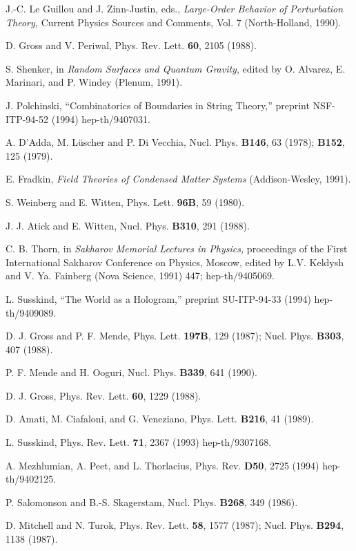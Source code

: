 \begin{thebibliography}{99}
 J.-C. Le Guillou and J. Zinn-Justin, eds., {\it
Large-Order Behavior of Perturbation Theory,} Current Physics
Sources and Comments, Vol. 7 (North-Holland, 1990).

 D. Gross and V. Periwal, Phys. Rev. Lett. {\bf 60},
2105 (1988).

 S. Shenker, in {\it Random Surfaces and Quantum
Gravity}, edited by O. Alvarez, E. Marinari, and P. Windey
(Plenum, 1991).

 J. Polchinski, ``Combinatorics of Boundaries in
String Theory,'' preprint NSF-ITP-94-52 (1994) hep-th/9407031.

 A. D'Adda, M. L\"uscher and P. Di Vecchia,
Nucl. Phys. {\bf B146}, 63 (1978); {\bf B152}, 125 (1979).

 E. Fradkin, {\it Field Theories of Condensed
Matter Systems} (Addison-Wesley, 1991).

 S. Weinberg and E. Witten, Phys. Lett. {\bf 96B}, 59 (1980).

 J. J. Atick and E. Witten, Nucl. Phys. {\bf B310},
291 (1988).

 C. B. Thorn, in {\it Sakharov Memorial Lectures in
Physics,} proceedings of the First
International Sakharov Conference on Physics, Moscow,
edited by L.V. Keldysh and V. Ya. Fainberg (Nova Science, 1991)
447; hep-th/9405069.

 L. Susskind, ``The World as a Hologram,''
preprint SU-ITP-94-33 (1994) hep-th/9409089.

 D. J. Gross and P. F. Mende,
Phys. Lett. {\bf 197B}, 129 (1987); Nucl. Phys.
{\bf B303}, 407 (1988).

 P. F. Mende and H. Ooguri,
Nucl. Phys. {\bf B339}, 641 (1990).

 D. J. Gross, Phys. Rev. Lett.
{\bf 60}, 1229 (1988). 

 D. Amati, M. Ciafaloni, and G. Veneziano,
Phys. Lett. {\bf B216}, 41 (1989).

 L. Susskind, Phys. Rev. Lett. {\bf 71}, 2367
(1993) hep-th/9307168.

 A. Mezhlumian, A. Peet, and L. Thorlacius,
Phys. Rev. {\bf D50}, 2725 (1994) hep-th/9402125.

 P. Salomonson and B.-S. Skagerstam, Nucl. Phys. {\bf
B268}, 349 (1986).

 D. Mitchell and N. Turok, Phys. Rev. Lett. {\bf
58}, 1577 (1987); Nucl. Phys. {\bf B294}, 1138 (1987).


\end{thebibliography}

